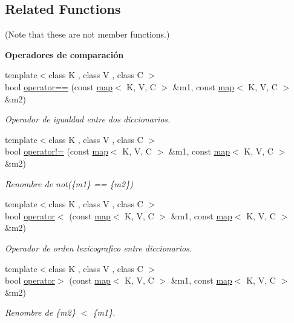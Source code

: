 \subsection*{Related Functions}
(Note that these are not member functions.) \begin{Indent}\textbf{ Operadores de comparación}\par
\begin{DoxyCompactItemize}
\item 
{\footnotesize template$<$class K , class V , class C $>$ }\\bool \hyperlink{classaed2_1_1map_abfc51b39670220e79037ac067006e933}{operator==} (const \hyperlink{classaed2_1_1map}{map}$<$ K, V, C $>$ \&m1, const \hyperlink{classaed2_1_1map}{map}$<$ K, V, C $>$ \&m2)
\begin{DoxyCompactList}\small\item\em Operador de igualdad entre dos diccionarios. \end{DoxyCompactList}\item 
{\footnotesize template$<$class K , class V , class C $>$ }\\bool \hyperlink{classaed2_1_1map_abce0fa35c5b25fd67111c2e704616f09}{operator!=} (const \hyperlink{classaed2_1_1map}{map}$<$ K, V, C $>$ \&m1, const \hyperlink{classaed2_1_1map}{map}$<$ K, V, C $>$ \&m2)
\begin{DoxyCompactList}\small\item\em Renombre de not(\{m1\} == \{m2\}) \end{DoxyCompactList}\item 
{\footnotesize template$<$class K , class V , class C $>$ }\\bool \hyperlink{classaed2_1_1map_a8ff07f6a24c290ea7e8f63ec7ab24f8d}{operator$<$} (const \hyperlink{classaed2_1_1map}{map}$<$ K, V, C $>$ \&m1, const \hyperlink{classaed2_1_1map}{map}$<$ K, V, C $>$ \&m2)
\begin{DoxyCompactList}\small\item\em Operador de orden lexicografico entre diccionarios. \end{DoxyCompactList}\item 
{\footnotesize template$<$class K , class V , class C $>$ }\\bool \hyperlink{classaed2_1_1map_a2000cd874b72034ce7fe730c811b6c63}{operator$>$} (const \hyperlink{classaed2_1_1map}{map}$<$ K, V, C $>$ \&m1, const \hyperlink{classaed2_1_1map}{map}$<$ K, V, C $>$ \&m2)
\begin{DoxyCompactList}\small\item\em Renombre de \{m2\} $<$ \{m1\}. \end{DoxyCompactList}\item 

\end{DoxyCompactItemize}
\end{Indent}
